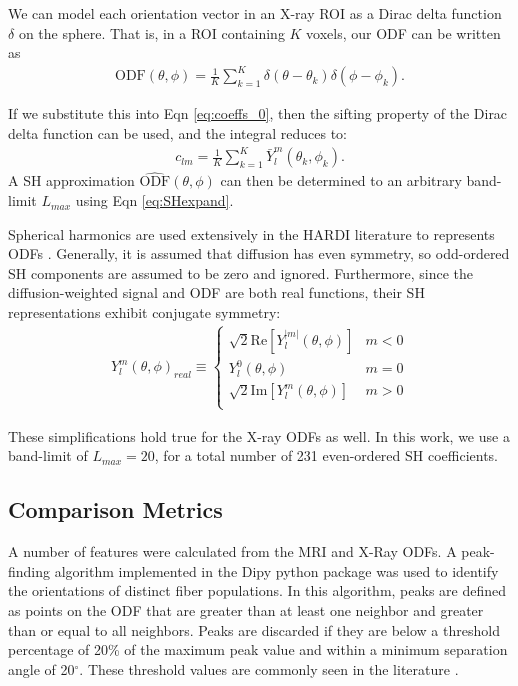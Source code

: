 \documentclass[11pt]{article}
\begin{document}
We can model each orientation vector in an X-ray ROI as a Dirac delta function
$\delta$ on the sphere. That is, in a ROI containing $K$ voxels, our ODF
can be written as
\begin{align}
  \text{ODF}(\theta, \phi) = \frac{1}{K}\sum_{k=1}^K \delta(\theta - \theta_k)\delta(\phi - \phi_k).
\end{align}

If we substitute this into Eqn \ref{eq:coeffs_0}, then the sifting property of the Dirac
delta function can be used, and the integral reduces to:
\begin{align}
  c_{lm} = \frac{1}{K}\sum_{k=1}^K \bar{Y}_l^m(\theta_k, \phi_k).
  \label{eq:get_coeffs}
\end{align}
A SH approximation $\hat{\text{ODF}}(\theta, \phi)$ can then be determined to an arbitrary
band-limit $L_{max}$ using Eqn \ref{eq:SHexpand}.

Spherical harmonics are used extensively in the HARDI literature to represents
ODFs \cite{Tournier2004}. Generally, it is assumed that diffusion has even
symmetry, so odd-ordered SH components are assumed to be zero and
ignored. Furthermore, since the diffusion-weighted signal and ODF are both real
functions, their SH representations exhibit conjugate symmetry:
\begin{align}
  Y_{l}^m(\theta, \phi)_{real} \equiv
  \begin{cases}
    \sqrt{2}\text{Re}\left[Y_l^{|m|}(\theta, \phi)\right] & m < 0\\
    Y_l^0(\theta, \phi) & m = 0\\
    \sqrt{2}\text{Im}\left[Y_l^m(\theta, \phi)\right] & m > 0\\
  \end{cases}
  \label{eq:real_Y}
\end{align}

These simplifications hold true for the X-ray ODFs as well. In this work, we use a
band-limit of $L_{max} = 20$, for a total number of 231 even-ordered SH coefficients. 

\subsection{Comparison Metrics}
A number of features were calculated from the MRI and X-Ray ODFs. A peak-finding
algorithm implemented in the Dipy python package \cite{Garyfallidis2014} was
used to identify the orientations of distinct fiber populations. In this
algorithm, peaks are defined as points on the ODF that are greater than at least
one neighbor and greater than or equal to all neighbors. Peaks are discarded if
they are below a threshold percentage of 20\% of the maximum peak value and
within a minimum separation angle of 20$^{\circ}$. These threshold values are
commonly seen in the literature \cite{Daducci2014, Schilling2018}.
\end{document}
